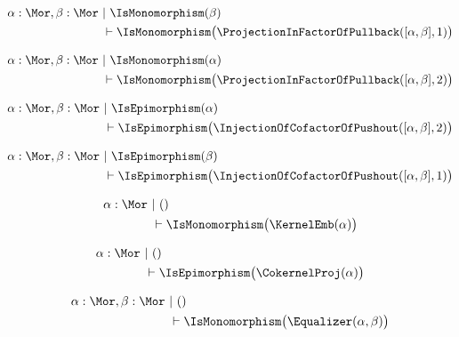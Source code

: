 
\begin{sequent}
\begin{align*}
  \alpha:\Mor, \beta:\Mor  ~&|~ \IsMonomorphism( \beta ) \\
  &\vdash \IsMonomorphism\big( \ProjectionInFactorOfPullback( [\alpha, \beta], 1 ) \big)
\end{align*}
\end{sequent}

\begin{sequent}
\begin{align*}
  \alpha:\Mor, \beta:\Mor ~&|~ \IsMonomorphism( \alpha ) \\
  &\vdash \IsMonomorphism\big( \ProjectionInFactorOfPullback( [\alpha, \beta], 2 ) \big)
\end{align*}
\end{sequent}

\begin{sequent}
\begin{align*}
  \alpha:\Mor, \beta:\Mor ~&|~ \IsEpimorphism( \alpha ) \\
  &\vdash \IsEpimorphism\big( \InjectionOfCofactorOfPushout( [\alpha, \beta], 2 ) \big)
\end{align*}
\end{sequent}

\begin{sequent}
\begin{align*}
  \alpha:\Mor, \beta:\Mor  ~&|~ \IsEpimorphism( \beta ) \\
  &\vdash \IsEpimorphism\big( \InjectionOfCofactorOfPushout( [\alpha, \beta], 1 ) \big)
\end{align*}
\end{sequent}

\begin{sequent}
\begin{align*}
  \alpha:\Mor ~&|~ () \\
  &\vdash \IsMonomorphism\big( \KernelEmb( \alpha ) \big)
\end{align*}
\end{sequent}

\begin{sequent}
\begin{align*}
  \alpha:\Mor ~&|~ () \\
  &\vdash \IsEpimorphism\big( \CokernelProj( \alpha ) \big)
\end{align*}
\end{sequent}

\begin{sequent}
\begin{align*}
  \alpha:\Mor, \beta:\Mor  ~&|~ () \\
  &\vdash \IsMonomorphism\big( \Equalizer( \alpha, \beta ) \big)
\end{align*}
\end{sequent}

